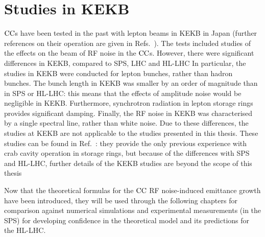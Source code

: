 \section{Studies in KEKB}\label{eq:past_studies_KEKB}
${\mathrm{CC}}$s have been tested in the past with lepton beams in KEKB in Japan (further references on their operation are given in Refs.~\cite{CC_KEKB_4440798, Funakoshi:1955812, oide:pac07-mozaki01}). %
The tests included studies of the effects on the beam of RF noise in the ${\mathrm{CC}}$s. However, there were significant differences in KEKB, compared to SPS, LHC and HL-LHC In particular, the studies in KEKB were conducted for lepton bunches, rather than hadron bunches.  The bunch length in KEKB was smaller by an order of magnitude than in SPS or HL-LHC: this means that the effects of amplitude noise would be negligible in KEKB.  Furthermore, synchrotron radiation in lepton storage rings provides significant damping.  Finally, the RF noise in KEKB was characterised by a single spectral line, rather than white noise. Due to these differences, the studies at KEKB are not applicable to the studies presented in this thesis. These studies can be found in Ref.~\cite{PhysRevSTAB.14.111003}: they provide the only previous experience with crab cavity operation in storage rings, but because of the differences with SPS and HL-LHC, further details of the KEKB studies are beyond the scope of this thesis



Now that the theoretical formulas for the ${\mathrm{CC}}$ RF noise-induced emittance growth have been introduced, they will be used through the following chapters for comparison against numerical simulations and experimental measurements (in the SPS) for developing confidence in the theoretical model and its predictions for the HL-LHC.
